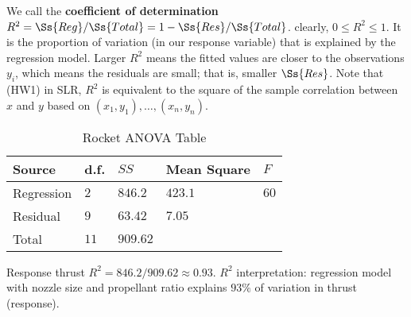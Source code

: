 We call the \textbf{coefficient of determination}
$ R^2 = \Ss{Reg}/\Ss{Total}=1-\Ss{Res}/\Ss{Total} $.
clearly, $ 0\leqslant R^2\leqslant 1 $. It is the proportion
of variation (in our response variable) that is explained
by the regression model. Larger $ R^2 $ means
the fitted values are closer to the observations $ y_i $,
which means the residuals are small; that is, smaller $ \Ss{Res} $.
Note that (HW1) in SLR, $ R^2 $ is equivalent to the square of
the sample correlation between $ x $ and $ y $
based on $ (x_1,y_1),\ldots,(x_n,y_n) $.

\begin{table}[H]
    \centering
    \caption{Rocket ANOVA Table}
    \begin{tabu} to 0.9\textwidth {Y[0.5]YYY[2]Y}
        \toprule
        Source     & d.f.   & $ SS $     & Mean Square & $ F $  \\
        \midrule
        Regression & $ 2 $  & $ 846.2 $  & $ 423.1 $   & $ 60 $ \\
        Residual   & $ 9 $  & $ 63.42 $  & $ 7.05 $    &        \\
        \midrule
        Total      & $ 11 $ & $ 909.62 $                        \\
        \bottomrule
    \end{tabu}
\end{table}
Response thrust
$ R^2=846.2/909.62 \approx 0.93 $. $ R^2 $
interpretation: regression model with nozzle size and propellant ratio
explains $ 93\% $ of variation in thrust (response).
